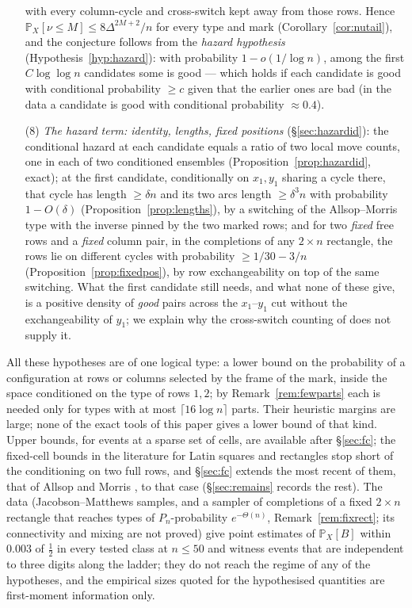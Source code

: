 \documentclass[11pt]{article}
\theoremstyle{definition}
\renewcommand{\Pr}{\mathbb{P}}
\newcommand{\PP}{P}
\begin{document}
\begin{enumerate}[leftmargin=2em]
with every column-cycle and cross-switch kept away from those rows.  Hence
$\Pr_X[\nu\le M]\le8\Delta^{2M+2}/n$ for every type and mark
(Corollary~\ref{cor:nutail}), and the conjecture follows from the \emph{hazard hypothesis}
(Hypothesis~\ref{hyp:hazard}): with probability $1-o(1/\log n)$, among the first
$C\log\log n$ candidates some is good --- which holds if each candidate is good with
conditional probability $\ge c$ given that the earlier ones are bad (in the data a
candidate is good with conditional probability $\approx0.4$).
\item[(8)] \emph{The hazard term: identity, lengths, fixed positions} (\S\ref{sec:hazardid}):
the conditional hazard at each candidate equals a ratio of two local move counts, one in
each of two conditioned ensembles (Proposition~\ref{prop:hazardid}, exact); at the first
candidate, conditionally on $x_1,y_1$ sharing a cycle there, that cycle has length
$\ge\delta n$ and its two arcs length $\ge\delta^3n$ with probability $1-O(\delta)$
(Proposition~\ref{prop:lengths}), by a switching of the Allsop--Morris type with the
inverse pinned by the two marked rows; and for two \emph{fixed} free rows and a
\emph{fixed} column pair, in the completions of any $2\times n$ rectangle, the rows lie
on different cycles with probability $\ge1/30-3/n$ (Proposition~\ref{prop:fixedpos}), by
row exchangeability on top of the same switching.  What the first candidate still needs,
and what none of these give, is a positive density of \emph{good} pairs across the
$x_1$--$y_1$ cut without the exchangeability of $y_1$; we explain why the cross-switch
counting of \cite{AM26} does not supply it.
\end{enumerate}
All these hypotheses are of one logical type: a lower bound on the probability of a
configuration at rows or columns selected by the frame of the mark, inside the space
conditioned on the type of rows $1,2$; by Remark~\ref{rem:fewparts} each is needed only
for types with at most $\lceil16\log n\rceil$ parts.  Their heuristic margins are large;
none of the exact tools of this paper gives a lower bound of that kind.  Upper bounds,
for events at a sparse set of cells, are available after \S\ref{sec:fc}; the
fixed-cell bounds in the literature for Latin squares and rectangles stop short of the
conditioning on two full rows, and \S\ref{sec:fc} extends the most recent of them, that of
Allsop and Morris \cite{AM26}, to that case (\S\ref{sec:remains} records the rest).  The data (Jacobson--Matthews samples, and a sampler of completions of a fixed
$2\times n$ rectangle that reaches types of $\PP_n$-probability $e^{-\Theta(n)}$,
Remark~\ref{rem:fixrect}; its connectivity and mixing are not proved) give point estimates
of $\Pr_X[B]$ within $0.003$ of $\tfrac12$ in every tested class at $n\le50$ and witness
events that are independent to three digits along the ladder; they do not reach the regime
of any of the hypotheses, and the empirical sizes quoted for the hypothesised quantities
are first-moment information only.
\end{document}
